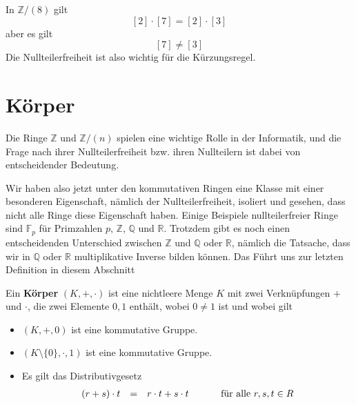 \medbreak

\begin{beispiel} In $\mathbb Z/ (8)$ gilt
  	$$ [2] \cdot [7] = [2] \cdot [3] $$
aber es gilt 
  	$$ [7] \neq [3] $$
Die Nullteilerfreiheit ist also wichtig für die Kürzungsregel.
\end{beispiel}

\section{Körper}\label{section_fields}

Die Ringe $\mathbb Z$ und  $\mathbb Z/ (n)$ spielen eine wichtige Rolle in der Informatik, und die 
Frage nach ihrer Nullteilerfreiheit bzw. ihren Nullteilern ist dabei von entscheidender Bedeutung.

Wir haben also jetzt unter den kommutativen Ringen eine Klasse mit einer besonderen Eigenschaft, nämlich der
Nullteilerfreiheit, isoliert und gesehen, dass nicht alle Ringe diese Eigenschaft haben. Einige Beispiele 
nullteilerfreier Ringe sind $\mathbb F_p$ für Primzahlen $p$, $\mathbb Z$, $\mathbb Q$ und $\mathbb R$. 
Trotzdem gibt es noch einen entscheidenden Unterschied zwischen $\mathbb Z$ und $\mathbb Q$ oder $\mathbb R$, 
nämlich die Tatsache, dass wir in $\mathbb Q$ oder $\mathbb R$ multiplikative Inverse bilden können. Das 
Führt uns zur letzten Definition in diesem Abschnitt

\begin{definition}  Ein \textbf{Körper} $(K, + , \cdot)$ ist eine nichtleere Menge $K$ mit 
zwei Verknüpfungen $+$ und 
$\cdot$, die zwei Elemente $0, 1$ enthält, wobei $0 \neq 1$ ist und wobei gilt

\begin{itemize}
  	\item $(K, +, 0)$ ist eine kommutative Gruppe.
  	\item $(K \setminus \{0\}, \cdot, 1)$ ist eine kommutative Gruppe.
  	\item Es gilt das Distributivgesetz
  		$$ \begin{array} {l c l c l}
    		(r + s) \cdot t & = & r \cdot t + s \cdot t & \quad & \textrm{ für alle } r, s, t \in R 
  		\end{array} $$
 \end{itemize}
\end{definition}

